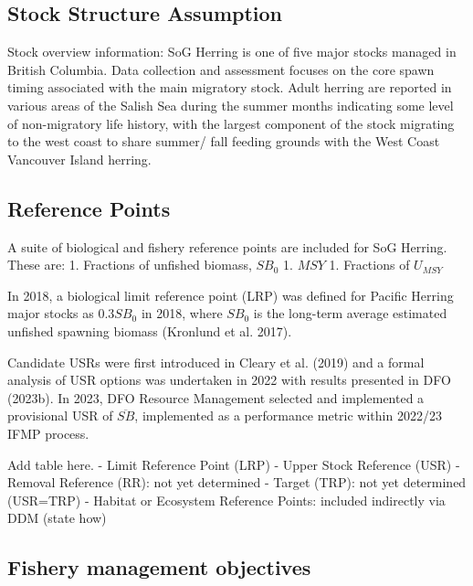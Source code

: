\documentclass[11pt]{book}
\begin{document}
\hypertarget{stock-structure-assumption}{%
\subsection*{Stock Structure Assumption}\label{stock-structure-assumption}}

Stock overview information: SoG Herring is one of five major stocks managed in British Columbia. Data collection and assessment focuses on the core spawn timing associated with the main migratory stock. Adult herring are reported in various areas of the Salish Sea during the summer months indicating some level of non-migratory life history, with the largest component of the stock migrating to the west coast to share summer/ fall feeding grounds with the West Coast Vancouver Island herring.

\hypertarget{reference-points}{%
\subsection*{Reference Points}\label{reference-points}}

A suite of biological and fishery reference points are included for SoG Herring. These are: 1. Fractions of unfished biomass, \({SB_0}\) 1. \({MSY}\) 1. Fractions of \(U_{MSY}\)

In 2018, a biological limit reference point (LRP) was defined for Pacific Herring major stocks as \(0.3SB_0\) in 2018, where \({SB_0}\) is the long-term average estimated unfished spawning biomass (Kronlund et al. 2017).

Candidate USRs were first introduced in Cleary et al. (2019) and a formal analysis of USR options was undertaken in 2022 with results presented in DFO (2023b). In 2023, DFO Resource Management selected and implemented a provisional USR of \(\overline{\mathit{SB}}\), implemented as a performance metric within 2022/23 IFMP process.

Add table here. - Limit Reference Point (LRP) - Upper Stock Reference (USR) - Removal Reference (RR): not yet determined - Target (TRP): not yet determined (USR=TRP) - Habitat or Ecosystem Reference Points: included indirectly via DDM (state how)

\hypertarget{fishery-management-objectives}{%
\subsection*{Fishery management objectives}\label{fishery-management-objectives}}
\end{document}
